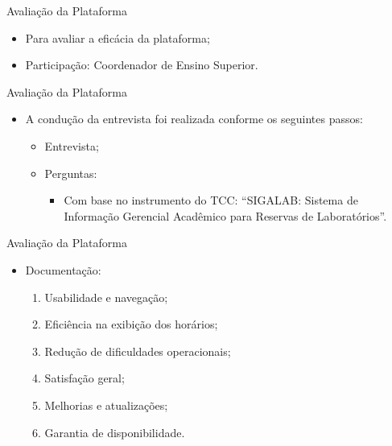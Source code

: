 \begin{frame}{Avaliação da Plataforma}
    \begin{itemize}
        \item Para avaliar a eficácia da plataforma; \vspace{0.5cm}
        \item Participação: Coordenador de Ensino Superior. \vspace{0.5cm}
    \end{itemize}
\end{frame}

\begin{frame}{Avaliação da Plataforma}
    \begin{itemize}
        \item A condução da entrevista foi realizada conforme os seguintes passos: \vspace{0.5cm}
              \begin{itemize}
                  \item Entrevista; \vspace{0.5cm}
                  \item Perguntas: \vspace{0.5cm}
                        \begin{itemize}
                            \item Com base no instrumento do TCC: ``SIGALAB: Sistema de Informação Gerencial Acadêmico para Reservas de Laboratórios''.
                        \end{itemize}
              \end{itemize}
    \end{itemize}
\end{frame}

\begin{frame}{Avaliação da Plataforma}
    \begin{itemize}
        \item Documentação: \vspace{0.5cm}
              \begin{enumerate}
                  \item Usabilidade e navegação; \vspace{0.5cm}
                  \item Eficiência na exibição dos horários; \vspace{0.5cm}
                  \item Redução de dificuldades operacionais; \vspace{0.5cm}
                  \item Satisfação geral; \vspace{0.5cm}
                  \item Melhorias e atualizações; \vspace{0.5cm}
                  \item Garantia de disponibilidade. \vspace{0.5cm}
              \end{enumerate}
    \end{itemize}
\end{frame}

